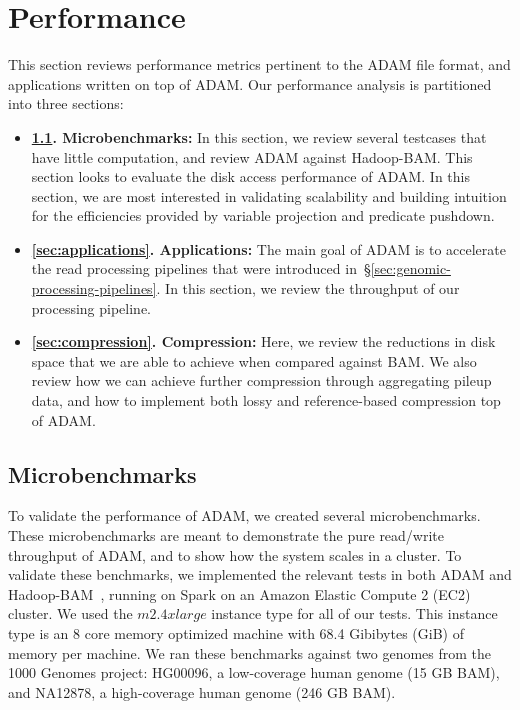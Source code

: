 \documentclass[10pt,twocolumn]{article}
\theoremstyle{plain}
\begin{document}
\section{Performance}
\label{sec:performance}

This section reviews performance metrics pertinent to the ADAM file format, and applications written on top of ADAM. Our performance
analysis is partitioned into three sections:

\begin{itemize}
\item {\bf \ref{sec:microbenchmarks}. Microbenchmarks:} In this section, we review several testcases that have little computation, and
review ADAM against Hadoop-BAM. This section looks to evaluate the disk access performance of ADAM. In this section, we are most
interested in validating scalability and building intuition for the efficiencies provided by variable projection and predicate pushdown.
\item {\bf \ref{sec:applications}. Applications:} The main goal of ADAM is to accelerate the read processing pipelines that were introduced
in~\S\ref{sec:genomic-processing-pipelines}. In this section, we review the throughput of our processing pipeline.
\item {\bf \ref{sec:compression}. Compression:} Here, we review the reductions in disk space that we are able to achieve when compared
against BAM. We also review how we can achieve further compression through aggregating pileup data, and how to implement both
lossy and reference-based compression top of ADAM.
\end{itemize}

\subsection{Microbenchmarks}
\label{sec:microbenchmarks}

To validate the performance of ADAM, we created several microbenchmarks. These microbenchmarks are meant to demonstrate
the pure read/write throughput of ADAM, and to show how the system scales in a cluster. To validate these benchmarks, we implemented
the relevant tests in both ADAM and Hadoop-BAM~\cite{niemenmaa12}, running on Spark on an Amazon Elastic Compute 2 (EC2)
cluster. We used the $m2.4xlarge$ instance type for all of our tests. This instance type is an 8 core memory optimized machine
with 68.4 Gibibytes (GiB) of memory per machine. We ran these benchmarks against two genomes from the 1000 Genomes project:
HG00096, a low-coverage human genome (15 GB BAM), and NA12878, a high-coverage human genome (246 GB BAM).
\end{document}
